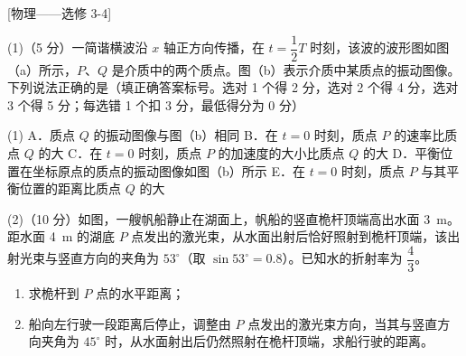 \begin{question}
[物理——选修 3-4]

(1)（5 分）一简谐横波沿 $x$ 轴正方向传播，在 $t=\dfrac{1}{2}T$ 时刻，该波的波形图如图（a）所示，$P$、$Q$ 是介质中的两个质点。图（b）表示介质中某质点的振动图像。下列说法正确的是\gkblank（填正确答案标号。选对 1 个得 2 分，选对 2 个得 4 分，选对 3 个得 5 分；每选错 1 个扣 3 分，最低得分为 0 分）


\begin{gkopts}(1)
  \task A．质点 $Q$ 的振动图像与图（b）相同
  \task B．在 $t=0$ 时刻，质点 $P$ 的速率比质点 $Q$ 的大
  \task C．在 $t=0$ 时刻，质点 $P$ 的加速度的大小比质点 $Q$ 的大
  \task D．平衡位置在坐标原点的质点的振动图像如图（b）所示
  \task E．在 $t=0$ 时刻，质点 $P$ 与其平衡位置的距离比质点 $Q$ 的大
\end{gkopts}

(2)（10 分）如图，一艘帆船静止在湖面上，帆船的竖直桅杆顶端高出水面 \SI{3}{\metre}。距水面 \SI{4}{\metre} 的湖底 $P$ 点发出的激光束，从水面出射后恰好照射到桅杆顶端，该出射光束与竖直方向的夹角为 $53^{\circ}$（取 $\sin53^{\circ}=0.8$）。已知水的折射率为 $\dfrac{4}{3}$。

\begin{enumerate}[leftmargin=2em, label=(\roman*)]
  \item 求桅杆到 $P$ 点的水平距离；
  \item 船向左行驶一段距离后停止，调整由 $P$ 点发出的激光束方向，当其与竖直方向夹角为 $45^{\circ}$ 时，从水面射出后仍然照射在桅杆顶端，求船行驶的距离。
\end{enumerate}

\end{question}
